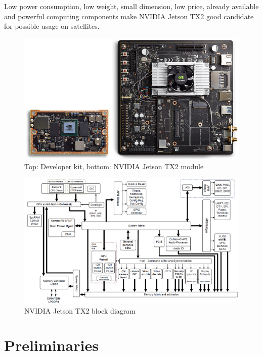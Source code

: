 \documentclass[12pt,a4paper,twoside]{article}
\begin{document}
Low power consumption, low weight, small dimension, low price, already available and powerful computing components make NVIDIA Jetson TX2 good candidate for possible usage on satellites.

\begin{figure}[!htbp]
\includegraphics[angle=90, scale=0.7]{NVIDIA_Jetson_TX2_Module_Devkit.png}
\centering
\caption[NVIDIA Jetson TX2 module]{Top: Developer kit, bottom: NVIDIA Jetson TX2 module\cite{nvidia-jetsontx2}}
\label{fig:jetson-image}
\end{figure}

\begin{figure}[!htbp]
\includegraphics[angle=90, scale=0.5]{Tegra_Parker_Block_Diagram-1.png}
\centering
\caption[NVIDIA Jetson TX2 block diagram]{NVIDIA Jetson TX2 block diagram \cite{nvidia-jetsontx2}}
\label{fig:jetson-diagram-image}
\end{figure}


\cleardoublepage
\section{Preliminaries}
\end{document}
